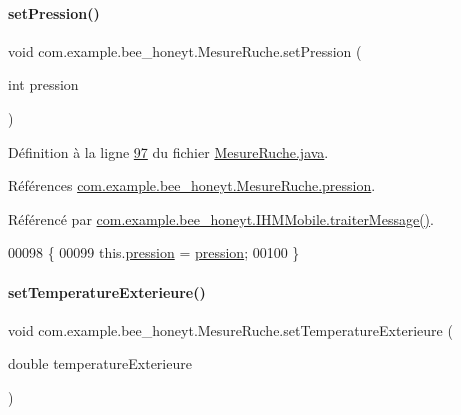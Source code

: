 \paragraph{\texorpdfstring{set\+Pression()}{setPression()}}
{\footnotesize\ttfamily void com.\+example.\+bee\+\_\+honeyt.\+Mesure\+Ruche.\+set\+Pression (\begin{DoxyParamCaption}\item[{int}]{pression }\end{DoxyParamCaption})}



Définition à la ligne \hyperlink{_mesure_ruche_8java_source_l00097}{97} du fichier \hyperlink{_mesure_ruche_8java_source}{Mesure\+Ruche.\+java}.



Références \hyperlink{_mesure_ruche_8java_source_l00021}{com.\+example.\+bee\+\_\+honeyt.\+Mesure\+Ruche.\+pression}.



Référencé par \hyperlink{_i_h_m_mobile_8java_source_l00374}{com.\+example.\+bee\+\_\+honeyt.\+I\+H\+M\+Mobile.\+traiter\+Message()}.


\begin{DoxyCode}
00098     \{
00099         this.\hyperlink{classcom_1_1example_1_1bee__honeyt_1_1_mesure_ruche_ae78080a6d5745faa411e3cfbdbf8aeec}{pression} = \hyperlink{classcom_1_1example_1_1bee__honeyt_1_1_mesure_ruche_ae78080a6d5745faa411e3cfbdbf8aeec}{pression};
00100     \}
\end{DoxyCode}
\mbox{\label{classcom_1_1example_1_1bee__honeyt_1_1_mesure_ruche_a41591480ad8be13a1c7e2e7049dc7935}} 
\paragraph{\texorpdfstring{set\+Temperature\+Exterieure()}{setTemperatureExterieure()}}
{\footnotesize\ttfamily void com.\+example.\+bee\+\_\+honeyt.\+Mesure\+Ruche.\+set\+Temperature\+Exterieure (\begin{DoxyParamCaption}\item[{double}]{temperature\+Exterieure }\end{DoxyParamCaption})}



